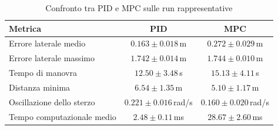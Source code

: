 \begin{table}[H]
    \centering
    \caption{Confronto tra PID e MPC sulle run rappresentative}
    \begin{tabular}{lcc}
        \toprule
        \textbf{Metrica} & \textbf{PID} & \textbf{MPC} \\
        \midrule
        Errore laterale medio & $0.163 \pm 0.018$\,m & $0.272 \pm 0.029$\,m \\
        Errore laterale massimo & $1.742 \pm 0.014$\,m & $1.744 \pm 0.010$\,m \\
        Tempo di manovra & $12.50 \pm 3.48$\,s & $15.13 \pm 4.11$\,s \\
        Distanza minima & $6.54 \pm 1.35$\,m & $5.10 \pm 1.17$\,m \\
        Oscillazione dello sterzo & $0.221 \pm 0.016$\,rad/s & $0.160 \pm 0.020$\,rad/s \\
        Tempo computazionale medio & $2.48 \pm 0.11$\,ms & $28.67 \pm 2.60$\,ms \\
        \bottomrule
    \end{tabular}
\end{table}
